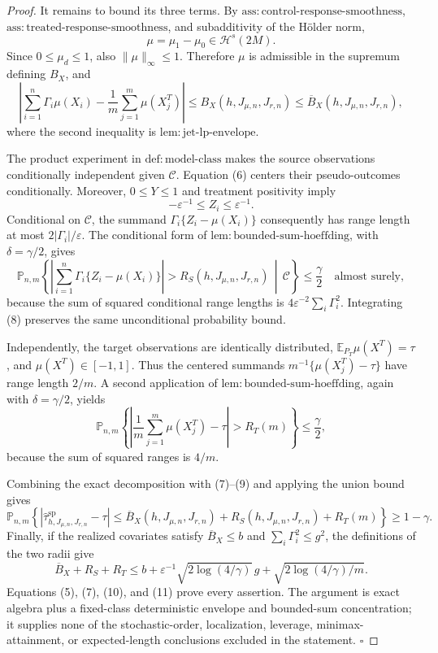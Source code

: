 \documentclass{article}
\begin{document}
\begin{proof}
It remains to bound its three terms.  By
\(\mathrm{ass:control\text{-}response\text{-}smoothness}\),
\(\mathrm{ass:treated\text{-}response\text{-}smoothness}\), and subadditivity of
the H\"older norm,
\[
\mu=\mu_1-\mu_0\in\mathcal H^s(2M).
\]
Since \(0\le\mu_d\le1\), also \(\|\mu\|_\infty\le1\).  Therefore \(\mu\) is
admissible in the supremum defining \(B_X\), and
\[
\left|\sum_{i=1}^n\Gamma_i\mu(X_i)
-\frac1m\sum_{j=1}^m\mu(X_j^T)\right|
\le B_X(h,J_{\mu,n},J_{r,n})
\le\overline B_X(h,J_{\mu,n},J_{r,n}),
\tag{7}
\]
where the second inequality is
\(\mathrm{lem:jet\text{-}lp\text{-}envelope}\).

The product experiment in \(\mathrm{def:model\text{-}class}\) makes the source
observations conditionally independent given \(\mathcal C\).  Equation (6) centers
their pseudo-outcomes conditionally.  Moreover, \(0\le Y\le1\) and treatment
positivity imply
\[
-\varepsilon^{-1}\le Z_i\le\varepsilon^{-1}.
\]
Conditional on \(\mathcal C\), the summand
\(\Gamma_i\{Z_i-\mu(X_i)\}\) consequently has range length at most
\(2|\Gamma_i|/\varepsilon\).  The conditional form of
\(\mathrm{lem:bounded\text{-}sum\text{-}hoeffding}\), with
\(\delta=\gamma/2\), gives
\[
\mathbb P_{n,m}\!\left\{
\left|\sum_{i=1}^n\Gamma_i\{Z_i-\mu(X_i)\}\right|
>R_S(h,J_{\mu,n},J_{r,n})\,\middle|\,\mathcal C\right\}
\le\frac\gamma2
\quad\text{almost surely},
\tag{8}
\]
because the sum of squared conditional range lengths is
\(4\varepsilon^{-2}\sum_i\Gamma_i^2\).  Integrating (8) preserves the same
unconditional probability bound.

Independently, the target observations are identically distributed,
\(\mathbb E_{P_T}\mu(X^T)=\tau\), and \(\mu(X^T)\in[-1,1]\).  Thus the centered
summands \(m^{-1}\{\mu(X_j^T)-\tau\}\) have range length \(2/m\).  A second
application of \(\mathrm{lem:bounded\text{-}sum\text{-}hoeffding}\), again with
\(\delta=\gamma/2\), yields
\[
\mathbb P_{n,m}\!\left\{
\left|\frac1m\sum_{j=1}^m\mu(X_j^T)-\tau\right|>R_T(m)
\right\}\le\frac\gamma2,
\tag{9}
\]
because the sum of squared ranges is \(4/m\).

Combining the exact decomposition with (7)--(9) and applying the union bound gives
\[
\mathbb P_{n,m}\!\left\{
\left|\widehat\tau^{\mathrm{sp}}_{h,J_{\mu,n},J_{r,n}}-\tau\right|
\le\overline B_X(h,J_{\mu,n},J_{r,n})
+R_S(h,J_{\mu,n},J_{r,n})+R_T(m)
\right\}\ge1-\gamma.
\tag{10}
\]
Finally, if the realized covariates satisfy \(\overline B_X\le b\) and
\(\sum_i\Gamma_i^2\le g^2\), the definitions of the two radii give
\[
\overline B_X+R_S+R_T
\le b+\varepsilon^{-1}\sqrt{2\log(4/\gamma)}\,g
+\sqrt{2\log(4/\gamma)/m}.
\tag{11}
\]
Equations (5), (7), (10), and (11) prove every assertion.  The argument is exact
algebra plus a fixed-class deterministic envelope and bounded-sum concentration;
it supplies none of the stochastic-order, localization, leverage,
minimax-attainment, or expected-length conclusions excluded in the statement.
\(\square\)
\end{proof}
\end{document}
